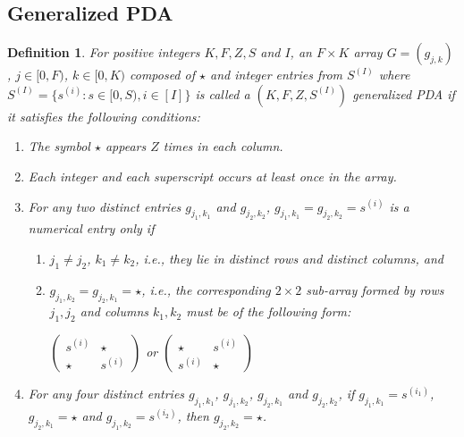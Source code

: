 \documentclass[conference,a4paper,10pt]{IEEEtran}
\newtheorem{defn}{Definition}
\begin{document}
\subsection{Generalized PDA}
\begin{defn}
	For positive integers $K,F,Z,S$ and $I$, an $F \times K$ array $G=(g_{j,k})$, $j \in [0,F)$, $k \in [0, K)$ composed of $\star $ and integer entries from $S^{(I)}$ where  
	$S^{(I)}=\{s^{(i)} : s \in [0,S), i\in [I]\}$ is called a $(K,F,Z,S^{(I)})$ generalized PDA if it satisfies the following conditions:
	\begin{enumerate}[label= C\arabic*.]
		\item The symbol $\star$ appears $Z$ times in each column.
		\item Each integer and each superscript occurs at least once in the array.
		\item For any two distinct entries $g_{j_1,k_1}$ and $g_{j_2,k_2}$, $g_{j_1,k_1}=g_{j_2,k_2}=s^{(i)}$ is a numerical entry only if
		\begin{enumerate}[label=\alph*)]
			
			\item $j_1 \neq j_2$, $k_1 \neq k_2$, i.e., they lie in distinct rows and distinct columns, and
			\item $g_{j_1,k_2}=g_{j_2,k_1}=\star$, i.e., the corresponding $2\times2$ sub-array formed by rows $j_1, j_2$ and columns $k_1,k_2$ must be of the following form:\\
			\begin{center}
				$\begin{pmatrix}
				s^{(i)} & \star\\
				\star & s^{(i)}
				\end{pmatrix}$
				\hspace{0.3cm}or\hspace{0.3cm}
				$\begin{pmatrix}
				\star & s^{(i)} \\
				s^{(i)} & \star
				\end{pmatrix}$ 
				
			\end{center}
		\end{enumerate}
		\item For any four distinct entries $g_{j_1,k_1}$, $g_{j_1,k_2}$, $g_{j_2,k_1}$ and $g_{j_2,k_2}$, if $g_{j_1,k_1} =s^{(i_1)}$, $g_{j_2,k_1}=\star$ and  $g_{j_1,k_2}=s^{(i_2)}$, then $g_{j_2,k_2}=\star$.
		
		
	\end{enumerate}
	
\end{defn}
\end{document}
